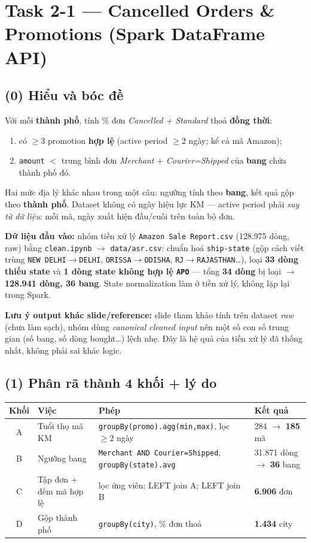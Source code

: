 \section*{Task 2-1 — Cancelled Orders \& Promotions (Spark DataFrame API)}

\subsection*{(0) Hiểu và bóc đề}
Với mỗi \textbf{thành phố}, tính \% đơn \emph{Cancelled + Standard} thoả \textbf{đồng thời}:
\begin{enumerate}
  \item có $\ge 3$ promotion \textbf{hợp lệ} (active period $\ge 2$ ngày; kể cả mã Amazon);
  \item \texttt{amount} $<$ trung bình đơn \emph{Merchant} + \emph{Courier=Shipped} của \textbf{bang} chứa thành phố đó.
\end{enumerate}
Hai mức địa lý khác nhau trong một câu: ngưỡng tính theo \textbf{bang}, kết quả gộp theo \textbf{thành phố}.
Dataset không có ngày hiệu lực KM — active period phải \emph{suy từ dữ liệu}: mỗi mã, ngày xuất hiện đầu/cuối trên toàn bộ đơn.

\textbf{Dữ liệu đầu vào:} nhóm tiền xử lý \texttt{Amazon Sale Report.csv} (128.975 dòng, raw) bằng \texttt{clean.ipynb} $\to$ \texttt{data/asr.csv}: chuẩn hoá \texttt{ship-state} (gộp cách viết trùng \texttt{NEW DELHI}$\to$\texttt{DELHI}, \texttt{ORISSA}$\to$\texttt{ODISHA}, \texttt{RJ}$\to$\texttt{RAJASTHAN}\ldots), loại \textbf{33 dòng thiếu state} và \textbf{1 dòng state không hợp lệ \texttt{APO}} --- tổng \textbf{34 dòng} bị loại $\to$ \textbf{128.941 dòng, 36 bang}. State normalization làm ở tiền xử lý, không lặp lại trong Spark.

\textbf{Lưu ý output khác slide/reference:} slide tham khảo tính trên dataset \emph{raw} (chưa làm sạch), nhóm dùng \emph{canonical cleaned input} nên một số con số trung gian (số bang, số dòng bought\ldots) lệch nhẹ. Đây là hệ quả của tiền xử lý đã thống nhất, không phải sai khác logic.

\subsection*{(1) Phân rã thành 4 khối + lý do}
\begin{center}
\begin{tabular}{clll}
\hline
Khối & Việc & Phép & Kết quả \\
\hline
A & Tuổi thọ mã KM & \texttt{groupBy(promo).agg(min,max)}, lọc $\ge 2$ ngày & 284 $\to$ \textbf{185} mã \\
B & Ngưỡng bang & \texttt{Merchant AND Courier=Shipped}, \texttt{groupBy(state).avg} & 31.871 dòng $\to$ \textbf{36} bang \\
C & Tập đơn + đếm mã hợp lệ & lọc ứng viên; LEFT join A; LEFT join B & \textbf{6.906} đơn \\
D & Gộp thành phố & \texttt{groupBy(city)}, \% đơn thoả & \textbf{1.434} city \\
\hline
\end{tabular}
\end{center}

